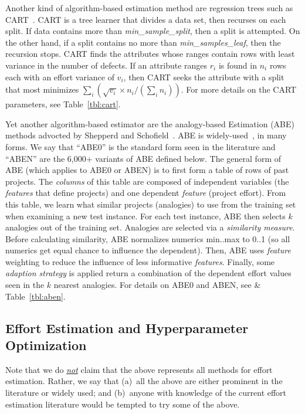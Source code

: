 Another kind of algorithm-based estimation method are regression trees such as   CART~\cite{brieman84}.  
CART is a  tree learner that divides a data set, then recurses
on each split.
If data contains more than {\em min\_sample\_split}, then a split is attempted.
On the other hand, if a split contains no more than {\em min\_samples\_leaf}, then the recursion stops. 
CART finds the attributes whose ranges contain rows with least variance in the number
of defects. If an  attribute ranges $r_i$ is found in 
$n_i$ rows each with an effort  variance of $v_i$, then CART seeks the  attribute with a split that most
minimizes $\sum_i \left(\sqrt{v_i}\times n_i/(\sum_i n_i)\right)$.
For more details on the CART parameters, see Table~\ref{tbl:cart}.


Yet another algorithm-based estimator are the 
analogy-based Estimation (ABE) methods advocted by Shepperd and Schofield~\cite{shepperd1997estimating}. ABE is widely-used~\cite{7194627,Kocaguneli2015,7426628,6092574,MenziesNeg:2017}, in many forms.
We  say that  ``ABE0'' is the standard  form  seen in the literature
and ``ABEN'' are the 6,000+ variants of ABE  defined below. 
The general form of ABE (which applies to  ABE0 or ABEN) is
to first form a table of rows of past projects. The {\em columns} of this table are composed of independent variables (the {\em features} that define projects) and one dependent {\em feature} (project  effort).
From this table, we learn  what  similar projects (analogies) to use from the training set when examining a new test instance.
For each test instance, ABE then selects   $k$ analogies out of the training set.
Analogies are selected via   a {\em similarity measure}. 
Before calculating similarity,  ABE normalizes   numerics  min..max to 0..1 (so all numerics   get equal chance to influence the dependent). 
Then, ABE uses {\em feature} weighting to reduce the influence of less informative {\em features}.
Finally, some  {\em adaption strategy} is applied  return a combination of  the dependent effort values seen in  the $k$ nearest analogies. For  details on ABE0 and ABEN, see  \& Table~\ref{tbl:aben}. 


\subsection{Effort Estimation and  Hyperparameter Optimization}
\label{sec:4}

Note that we do \underline{{\em not}} claim that the above represents all methods for  effort estimation. Rather, we  say that (a)~all the above are either prominent in the literature or widely used; and (b)~anyone  with knowledge of  the current effort estimation 
literature would be tempted to try some of the above.

